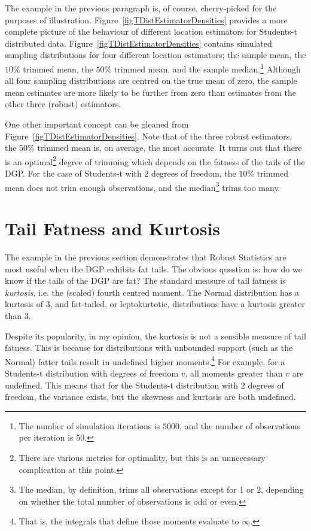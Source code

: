 \documentclass[12pt,a4paper]{amsart}
\begin{document}
The example in the previous paragraph is, of course, cherry-picked for the purposes of illustration. Figure~\ref{figTDistEstimatorDensities} provides a more complete picture of the behaviour of different location estimators for Students-t distributed data. Figure~\ref{figTDistEstimatorDensities} contains simulated sampling distributions for four different location estimators; the sample mean, the $10$\% trimmed mean, the $50$\% trimmed mean, and the sample median.\footnote{The number of simulation iterations is $5000$, and the number of observations per iteration is 50.} Although all four sampling distributions are centred on the true mean of zero, the sample mean estimates are more likely to be further from zero than estimates from the other three (robust) estimators.

One other important concept can be gleaned from Figure~\ref{figTDistEstimatorDensities}. Note that of the three robust estimators, the $50$\% trimmed mean is, on average, the most accurate. It turns out that there is an optimal\footnote{There are various metrics for optimality, but this is an unnecessary complication at this point.} degree of trimming which depends on the fatness of the tails of the DGP. For the case of Students-t with 2 degrees of freedom, the $10$\% trimmed mean does not trim enough observations, and the median\footnote{The median, by definition, trims all observations except for 1 or 2, depending on whether the total number of observations is odd or even.} trims too many.


\section{Tail Fatness and Kurtosis}\label{secTailFatness}

The example in the previous section demonstrates that Robust Statistics are most useful when the DGP exhibits fat tails. The obvious question is: how do we know if the tails of the DGP are fat? The standard measure of tail fatness is \emph{kurtosis}, i.e. the (scaled) fourth centred moment. The Normal distribution has a kurtosis of $3$, and fat-tailed, or leptokurtotic, distributions have a kurtosis greater than $3$.

Despite its popularity, in my opinion, the kurtosis is not a sensible measure of tail fatness. This is because for distributions with unbounded support (such as the Normal) fatter tails result in undefined higher moments.\footnote{That is, the integrals that define those moments evaluate to $\infty$.} For example, for a Students-t distribution with degrees of freedom $v$, all moments greater than $v$ are undefined. This means that for the Students-t distribution with $2$ degrees of freedom, the variance exists, but the skewness and kurtosis are both undefined.
\end{document}
